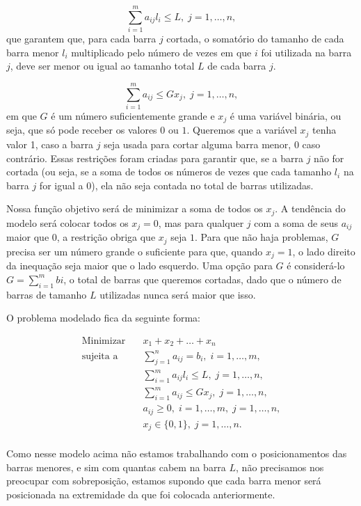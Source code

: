 \documentclass{article}
\begin{document}
$$\sum_{i=1}^m a_{ij}l_i \leq L, \;j = 1, \dots, n,$$
que garantem que, para cada barra $j$ cortada, o somatório do tamanho de cada barra menor $l_i$ multiplicado pelo número de vezes em que $i$ foi utilizada na barra $j$, deve ser menor ou igual ao tamanho total $L$ de cada barra $j$.

$$\sum_{i=1}^m a_{ij} \leq Gx_j, \;j = 1, \dots, n,$$
em que $G$ é um número suficientemente grande e $x_j$ é uma variável binária, ou seja, que só pode receber os valores $0$ ou $1$. Queremos que a variável $x_j$ tenha valor 1, caso a barra $j$ seja usada para cortar alguma barra menor, 0 caso contrário.
Essas restrições foram criadas para garantir que, se a barra $j$ não for cortada (ou seja, se a soma de todos os números de vezes que cada tamanho $l_i$ na barra $j$ for igual a $0$), ela não seja contada no total de barras utilizadas. 

Nossa função objetivo será de minimizar a soma de todos os $x_j$. A tendência do modelo será colocar todos os $x_j = 0$, mas para qualquer $j$ com a soma de seus $a_{ij}$ maior que $0$, a restrição obriga que $x_j$ seja $1$. Para que não haja problemas, $G$ precisa ser um número grande o suficiente para que, quando $x_j = 1$, o lado direito da inequação seja maior que o lado esquerdo. Uma opção para $G$ é considerá-lo $G = \sum_{i=1}^m bi$, o total de barras que queremos cortadas, dado que o número de barras de tamanho $L$ utilizadas nunca será maior que isso.

O problema modelado fica da seguinte forma:

\begin{equation*}
   \begin{aligned}
    \textrm{Minimizar} \quad & x_1 + x_2 + \dots + x_n\\
    \textrm{sujeita a} \quad & \sum_{j=1}^n a_{ij} = b_i, \; i = 1, \dots, m,\\
      &  \sum_{i=1}^m a_{ij}l_i \leq L, \; j = 1, \dots, n,   \\
      &  \sum_{i=1}^m a_{ij} \leq Gx_j , \; j = 1, \dots, n,\\
      & a_{ij} \geq 0, \; i = 1, \dots, m, \; j= 1, \dots, n,\\
      & x_j \in \{0,1\}, \; j=1, \dots, n.\\
    \end{aligned}
\end{equation*}
\;

Como nesse modelo acima não estamos trabalhando com o posicionamentos das barras menores, e sim com quantas cabem na barra $L$, não precisamos nos preocupar com sobreposição, estamos supondo que cada barra menor será posicionada na extremidade da que foi colocada anteriormente.
\end{document}
